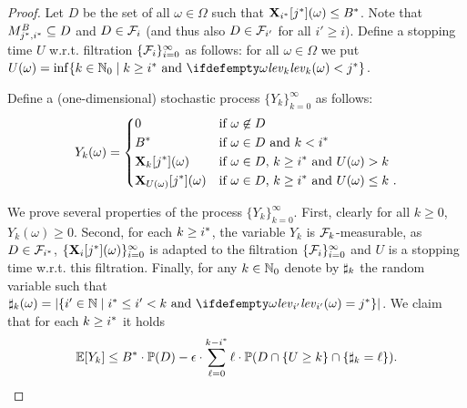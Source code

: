 \begin{proof}
Let $D$ be the set of all $\omega\in \Omega$ such that 
$\mathbf{X}_{{i}^*}[{j}^*](\omega)\leq {B}^*$. Note that $M_{{j}^*,{i}^*}^{B} \subseteq D$ and $D\in 
\mathcal{F}_i$ (and thus also $D\in \mathcal{F}_{i'}$ for all $i'\geq i$). 
Define a stopping time $U$ w.r.t. filtration $\{\mathcal{F}_i\}_{i=0}^{\infty}$ as follows: for all $\omega \in \Omega$ 
we put 
$U(\omega)=\inf\{k\in \Nset_0 \mid k\geq \fixn{i} \text{ and }
\levelrank{\omega}{k} < \fixn{j} \}$.

Define a 
(one-dimensional) stochastic process $\{Y_k\}_{k=0}^{\infty}$ as 
follows:
$$
Y_k(\omega) = \begin{dcases}
0 & \text{if $\omega \not\in D$}\\
{B}^* & \text{if $\omega \in D$ and $k<{i}^*$ }\\
\mathbf{X}_{k}[{j}^*](\omega) & \text{if $\omega \in D$, $k\geq {i}^*$ and 
$U(\omega)>k$ 
}\\
\mathbf{X}_{U(\omega)}[{j}^*](\omega) & \text{if $\omega\in D$, $k\geq 
{i}^*$ and 
$U(\omega)\leq k$ }.
\end{dcases}
$$

We prove several properties of the process $\{Y_k\}_{k=0}^{\infty}$. 
First, clearly for all $k\geq 0$, $Y_k(\omega)\geq 0$. Second, for each $k\geq {i}^*$, the variable $Y_k$ is $\mathcal{F}_k$-measurable, as $D\in \mathcal{F}_{{i}^*}$, $\{\mathbf{X}_{i}[{j}^*](\omega)\}_{i=0}^{\infty}$ is adapted to the filtration $\{\mathcal{F}_i\}_{i=0}^{\infty}$ and $U$ is a stopping time w.r.t. this filtration. Finally, for any $k\in \mathbb{N}_0$ denote by 
$\sharp_k$ the random variable such that $\noofdec_k(\omega) = |\{i'\in 
\Nset\mid \fixn{i} \leq i' < k \text{ and } \levelrank{\omega}{i'}=\fixn{j}\} |$.
We claim 
that for each $k\geq {i}^*$ 
it holds 
\begin{equation}
\label{eq:lexrsm-soundness-main}
\mathbb{E}[Y_k]\leq {B}^*\cdot \mathbb{P}(D) - \epsilon\cdot\sum_{\ell=0}^{k-{i}^*} \ell\cdot\mathbb{P}(D 
\cap \{U\geq k\} \cap \{\sharp_k 
= 
\ell\}).
\end{equation}


\end{proof}

